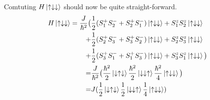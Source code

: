 \documentclass{article}
\begin{document}
Comtuting $H\ket{\uparrow\downarrow\downarrow}$ should now be quite straight-forward.
\begin{align*}
H\ket{\uparrow\downarrow\downarrow} = 
\frac{J}{\hbar^2} \big(&\frac{1}{2} (S_1^+S_2^- + S_2^+S_1^-)\ket{\uparrow\downarrow\downarrow} + S_1^zS_2^z\ket{\uparrow\downarrow\downarrow} \\
+&\frac{1}{2}(S_2^+S_3^- + S_3^+S_2^-)\ket{\uparrow\downarrow\downarrow} + S_2^zS_3^z\ket{\uparrow\downarrow\downarrow} \\
+&\frac{1}{2}(S_3^+S_1^- + S_1^+S_3^-)\ket{\uparrow\downarrow\downarrow} + S_3^zS_1^z\ket{\uparrow\downarrow\downarrow} \big)\\
=&\frac{J}{\hbar^2}\big(
\frac{\hbar^2}{2}\ket{\downarrow\uparrow\downarrow} 
\frac{\hbar^2}{2}\ket{\downarrow\downarrow\uparrow} 
\frac{\hbar^2}{4}\ket{\uparrow\downarrow\downarrow} 
\big) \\
=&J(
\frac{1}{2}\ket{\downarrow\uparrow\downarrow} 
\frac{1}{2}\ket{\downarrow\downarrow\uparrow} 
\frac{1}{4}\ket{\uparrow\downarrow\downarrow})
\end{align*}
\end{document}
